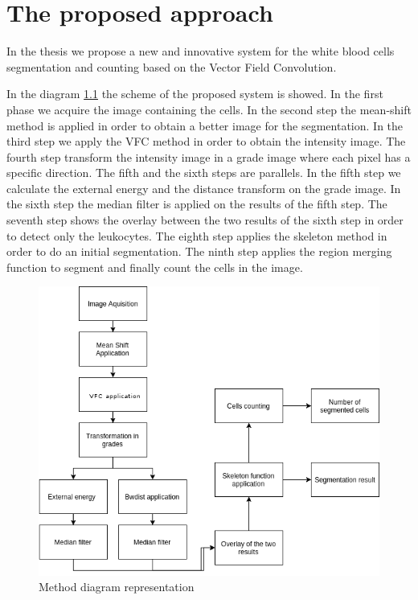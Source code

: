 \chapter{The proposed approach}
In the thesis we propose a new and innovative system for the white blood cells segmentation and counting based on the Vector Field Convolution.

\bigskip
In the diagram \ref{fig:diag} the scheme of the proposed system is showed. In the first phase we acquire the image containing the cells. In the second step the mean-shift method is applied in order to obtain a better image for the segmentation. In the third step we apply the VFC method in order to obtain the intensity image. The fourth step transform the intensity image in a grade image where each pixel has a specific direction. The fifth and the sixth steps are parallels. In the fifth step we calculate the external energy and the  distance transform on the grade image. In the sixth step the median filter is applied on the results of the fifth step. The seventh step shows the overlay between the two results of the sixth step in order to detect only the leukocytes. The eighth step applies the skeleton method in order to do an initial segmentation. The ninth step applies the region merging function to segment and finally count the cells in the image. 
\begin{figure}
	\begin{center}
		\centering
		\includegraphics[scale=0.5]{img/diag.png}
		\caption{Method diagram representation}
		\label{fig:diag}
	\end{center}
\end{figure}


